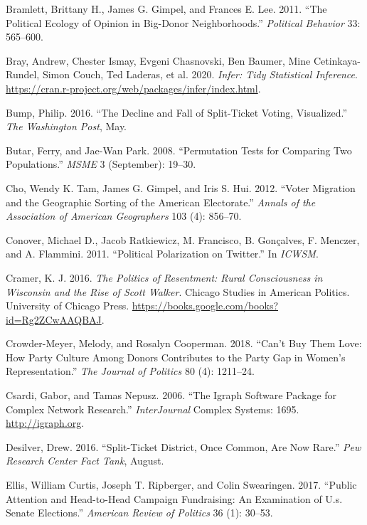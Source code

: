 \documentclass[12pt,]{article}
\begin{document}
\leavevmode\hypertarget{ref-bramlett2011}{}%
Bramlett, Brittany H., James G. Gimpel, and Frances E. Lee. 2011. ``The
Political Ecology of Opinion in Big-Donor Neighborhoods.''
\emph{Political Behavior} 33: 565--600.

\leavevmode\hypertarget{ref-infer}{}%
Bray, Andrew, Chester Ismay, Evgeni Chasnovski, Ben Baumer, Mine
Cetinkaya-Rundel, Simon Couch, Ted Laderas, et al. 2020. \emph{Infer:
Tidy Statistical Inference}.
\url{https://cran.r-project.org/web/packages/infer/index.html}.

\leavevmode\hypertarget{ref-bump2016}{}%
Bump, Philip. 2016. ``The Decline and Fall of Split-Ticket Voting,
Visualized.'' \emph{The Washington Post}, May.

\leavevmode\hypertarget{ref-butar2008}{}%
Butar, Ferry, and Jae-Wan Park. 2008. ``Permutation Tests for Comparing
Two Populations.'' \emph{MSME} 3 (September): 19--30.

\leavevmode\hypertarget{ref-cho2012}{}%
Cho, Wendy K. Tam, James G. Gimpel, and Iris S. Hui. 2012. ``Voter
Migration and the Geographic Sorting of the American Electorate.''
\emph{Annals of the Association of American Geographers} 103 (4):
856--70.

\leavevmode\hypertarget{ref-conover2011}{}%
Conover, Michael D., Jacob Ratkiewicz, M. Francisco, B. Gonçalves, F.
Menczer, and A. Flammini. 2011. ``Political Polarization on Twitter.''
In \emph{ICWSM}.

\leavevmode\hypertarget{ref-cramer2016}{}%
Cramer, K. J. 2016. \emph{The Politics of Resentment: Rural
Consciousness in Wisconsin and the Rise of Scott Walker}. Chicago
Studies in American Politics. University of Chicago Press.
\url{https://books.google.com/books?id=Rg2ZCwAAQBAJ}.

\leavevmode\hypertarget{ref-crowder-meyer2018}{}%
Crowder-Meyer, Melody, and Rosalyn Cooperman. 2018. ``Can't Buy Them
Love: How Party Culture Among Donors Contributes to the Party Gap in
Women's Representation.'' \emph{The Journal of Politics} 80 (4):
1211--24.

\leavevmode\hypertarget{ref-igraph}{}%
Csardi, Gabor, and Tamas Nepusz. 2006. ``The Igraph Software Package for
Complex Network Research.'' \emph{InterJournal} Complex Systems: 1695.
\url{http://igraph.org}.

\leavevmode\hypertarget{ref-desilver2016}{}%
Desilver, Drew. 2016. ``Split-Ticket District, Once Common, Are Now
Rare.'' \emph{Pew Research Center Fact Tank}, August.

\leavevmode\hypertarget{ref-ellis2017}{}%
Ellis, William Curtis, Joseph T. Ripberger, and Colin Swearingen. 2017.
``Public Attention and Head-to-Head Campaign Fundraising: An Examination
of U.s. Senate Elections.'' \emph{American Review of Politics} 36 (1):
30--53.
\end{document}
